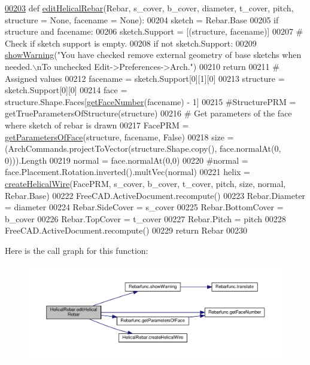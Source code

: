 \begin{DoxyCode}
\hypertarget{namespaceHelicalRebar.tex_l00203}{}\hyperlink{namespaceHelicalRebar_aea0d3838b1b171f801acf1046d111c8b}{00203} \textcolor{keyword}{def }\hyperlink{namespaceHelicalRebar_aea0d3838b1b171f801acf1046d111c8b}{editHelicalRebar}(Rebar, s\_cover, b\_cover, diameter, t\_cover, pitch, structure = None, 
      facename = None):
00204     sketch = Rebar.Base
00205     \textcolor{keywordflow}{if} structure \textcolor{keywordflow}{and} facename:
00206         sketch.Support = [(structure, facename)]
00207     \textcolor{comment}{# Check if sketch support is empty.}
00208     \textcolor{keywordflow}{if} \textcolor{keywordflow}{not} sketch.Support:
00209         \hyperlink{namespaceRebarfunc_a2278a0602d46a62953af1fcf2e574a94}{showWarning}(\textcolor{stringliteral}{"You have checked remove external geometry of base sketchs when needed.\(\backslash\)nTo
       unchecked Edit->Preferences->Arch."})
00210         \textcolor{keywordflow}{return}
00211     \textcolor{comment}{# Assigned values}
00212     facename = sketch.Support[0][1][0]
00213     structure = sketch.Support[0][0]
00214     face = structure.Shape.Faces[\hyperlink{namespaceRebarfunc_a3885b3b63e3a41508ac79bc7550cf301}{getFaceNumber}(facename) - 1]
00215     \textcolor{comment}{#StructurePRM = getTrueParametersOfStructure(structure)}
00216     \textcolor{comment}{# Get parameters of the face where sketch of rebar is drawn}
00217     FacePRM = \hyperlink{namespaceRebarfunc_a92122b3d7cedd3d47bb63380a5ac4d08}{getParametersOfFace}(structure, facename, \textcolor{keyword}{False})
00218     size = (ArchCommands.projectToVector(structure.Shape.copy(), face.normalAt(0, 0))).Length
00219     normal = face.normalAt(0,0)
00220     \textcolor{comment}{#normal = face.Placement.Rotation.inverted().multVec(normal)}
00221     helix = \hyperlink{namespaceHelicalRebar_a1a2b3ce39b904ab0c3892ed0965d2844}{createHelicalWire}(FacePRM, s\_cover, b\_cover, t\_cover, pitch, size, normal, 
      Rebar.Base)
00222     FreeCAD.ActiveDocument.recompute()
00223     Rebar.Diameter = diameter
00224     Rebar.SideCover = s\_cover
00225     Rebar.BottomCover = b\_cover
00226     Rebar.TopCover = t\_cover
00227     Rebar.Pitch = pitch
00228     FreeCAD.ActiveDocument.recompute()
00229     \textcolor{keywordflow}{return} Rebar
00230 
\end{DoxyCode}


Here is the call graph for this function\+:\nopagebreak
\begin{figure}[H]
\begin{center}
\leavevmode
\includegraphics[width=350pt]{namespaceHelicalRebar_aea0d3838b1b171f801acf1046d111c8b_cgraph}
\end{center}
\end{figure}




